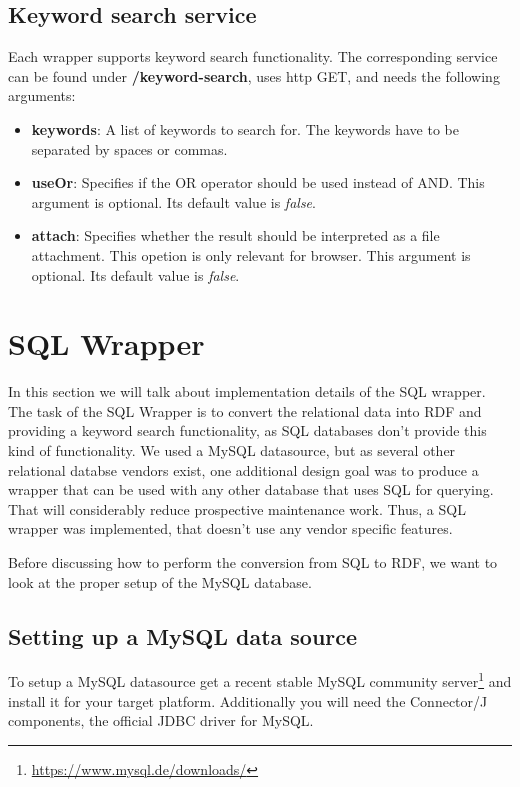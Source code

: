 \subsection{Keyword search service}

Each wrapper supports keyword search functionality. The corresponding service can be found under 
\textbf{/keyword-search}, uses http GET, and needs the following arguments:
\begin{itemize}
\item \textbf{keywords}: A list of keywords to search for. The keywords have to be separated by spaces or commas.
\item \textbf{useOr}: Specifies if the OR operator should be used instead of AND. This argument is optional. Its default value is \emph{false}.
\item \textbf{attach}: Specifies whether the result should be interpreted as a file attachment. This opetion is only relevant for browser. This argument is optional. Its default value is \emph{false}.
\end{itemize}


\section{SQL Wrapper}

In this section we will talk about implementation details of the SQL wrapper. 
The task of the SQL Wrapper is to convert the relational data into RDF and providing a keyword search functionality, as SQL databases don't provide this kind of  functionality.
We used a MySQL datasource, but as several other relational databse vendors exist, one additional design goal was to produce a wrapper that can be used with any other database that uses SQL for querying. That will considerably reduce prospective maintenance work.
Thus, a SQL wrapper was implemented, that doesn't use any vendor specific features.

Before discussing how to perform the conversion from SQL to RDF, we want to look at the proper setup of the MySQL database.



\subsection{Setting up a MySQL data source}

To setup a MySQL datasource get a recent stable MySQL community server\footnote{\url{https://www.mysql.de/downloads/}} 
and install it for your target platform. Additionally you will need the Connector/J components, the official JDBC driver for MySQL. 

